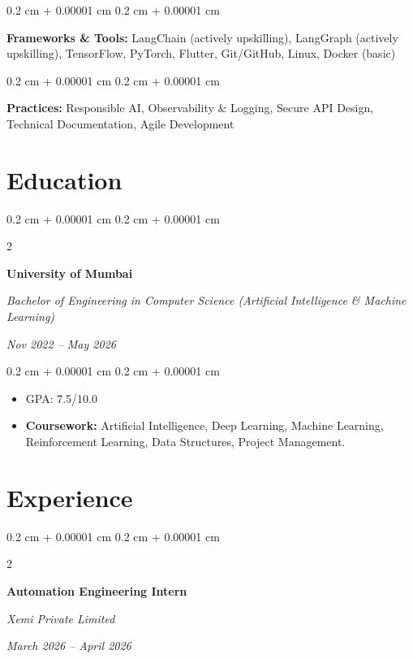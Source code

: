 \documentclass[10pt, letterpaper]{article}
\newenvironment{highlights}{
    \begin{itemize}[
        topsep=0.10 cm,
        parsep=0.10 cm,
        partopsep=0pt,
        itemsep=0pt,
        leftmargin=0.4 cm + 10pt
    ]
}{
    \end{itemize}
}
\newenvironment{onecolentry}{
    \begin{adjustwidth}{
        0.2 cm + 0.00001 cm
    }{
        0.2 cm + 0.00001 cm
    }
}{
    \end{adjustwidth}
}
\newenvironment{twocolentry}[2][]{
    \onecolentry
    \def\secondColumn{#2}
    \setcolumnwidth{\fill, 4.5 cm}
    \begin{paracol}{2}
}{
    \switchcolumn \raggedleft \secondColumn
    \end{paracol}
    \endonecolentry
}
\begin{document}
        \begin{onecolentry}
            \textbf{Frameworks \& Tools:} LangChain (actively upskilling), LangGraph (actively upskilling), TensorFlow, PyTorch, Flutter, Git/GitHub, Linux, Docker (basic)
        \end{onecolentry}

        \vspace{0.2 cm}

        \begin{onecolentry}
            \textbf{Practices:} Responsible AI, Observability \& Logging, Secure API Design, Technical Documentation, Agile Development
        \end{onecolentry}


    \section{Education}

        \begin{twocolentry}{
            \textit{Nov 2022 – May 2026}}
            \textbf{University of Mumbai}

            \textit{Bachelor of Engineering in Computer Science (Artificial Intelligence \& Machine Learning)}
        \end{twocolentry}

        \vspace{0.10 cm}
        \begin{onecolentry}
            \begin{highlights}
                \item GPA: 7.5/10.0
                \item \textbf{Coursework:} Artificial Intelligence, Deep Learning, Machine Learning, Reinforcement Learning, Data Structures, Project Management.
            \end{highlights}
        \end{onecolentry}


    \section{Experience}

        \begin{twocolentry}{
            \textit{March 2026 – April 2026}}
            \textbf{Automation Engineering Intern}

            \textit{Xemi Private Limited}
        \end{twocolentry}
\end{document}
